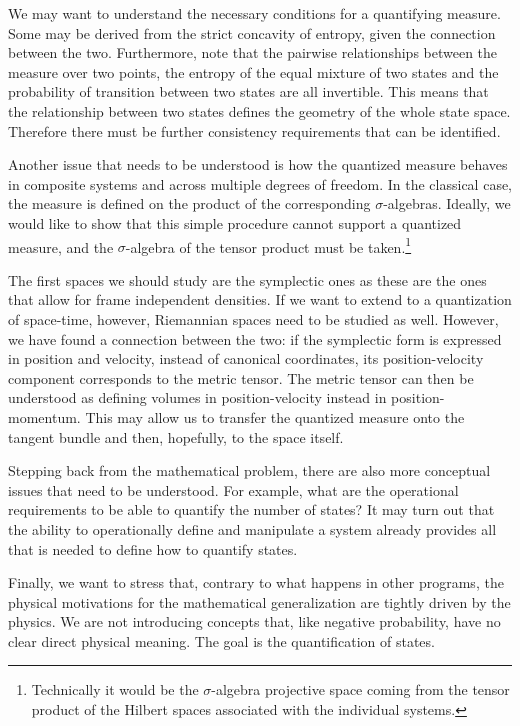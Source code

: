 \documentclass[entropy,article,submit,pdftex,moreauthors]{Definitions/mdpi}
\begin{document}
We may want to understand the necessary conditions for a quantifying measure. Some may be derived from the strict concavity of entropy, given the connection between the two. Furthermore, note that the pairwise relationships between the measure over two points, the entropy of the equal mixture of two states and the probability of transition between two states are all invertible. This means that the relationship between two states defines the geometry of the whole state space. Therefore there must be further consistency requirements that can be identified.

Another issue that needs to be understood is how the quantized measure behaves in composite systems and across multiple degrees of freedom. In the classical case, the measure is defined on the product of the corresponding $\sigma$-algebras. Ideally, we would like to show that this simple procedure cannot support a quantized measure, and the $\sigma$-algebra of the tensor product must be taken.\footnote{Technically it would be the $\sigma$-algebra projective space coming from the tensor product of the Hilbert spaces associated with the individual systems.}

The first spaces we should study are the symplectic ones as these are the ones that allow for frame independent densities. If we want to extend to a quantization of space-time, however, Riemannian spaces need to be studied as well. However, we have found a connection between the two: if the symplectic form is expressed in position and velocity, instead of canonical coordinates, its position-velocity component corresponds to the metric tensor. The metric tensor can then be understood as defining volumes in position-velocity instead in position-momentum. This may allow us to transfer the quantized measure onto the tangent bundle and then, hopefully, to the space itself.

Stepping back from the mathematical problem, there are also more conceptual issues that need to be understood. For example, what are the operational requirements to be able to quantify the number of states? It may turn out that the ability to operationally define and manipulate a system already provides all that is needed to define how to quantify states.

Finally, we want to stress that, contrary to what happens in other programs, the physical motivations for the mathematical generalization are tightly driven by the physics. We are not introducing concepts that, like negative probability, have no clear direct physical meaning. The goal is the quantification of states.
\end{document}
